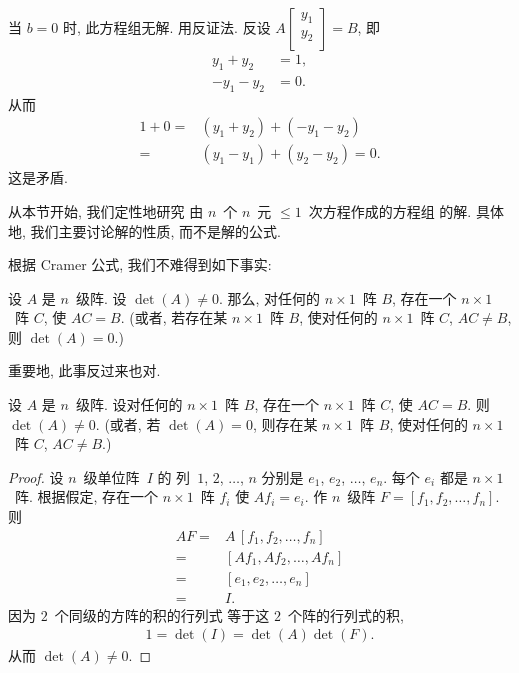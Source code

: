 \documentclass[../libro.tex]{subfiles}
\begin{document}
\begin{example}
    当 \(b = 0\) 时, 此方程组无解.
    用反证法.
    反设
    \(
        A
        \begin{bmatrix}
            y_1 \\
            y_2 \\
        \end{bmatrix}
        = B
    \),
    即
    \begin{align*}
        y_1 + y_2  & = 1, \\
        -y_1 - y_2 & = 0.
    \end{align*}
    从而
    \begin{align*}
        1 + 0
        = {} & (y_1 + y_2) + (-y_1 - y_2) \\
        = {} & (y_1 - y_1) + (y_2 - y_2) = 0.
    \end{align*}
    这是矛盾.
\end{example}

从本节开始, 我们定性地研究%
由 \(n\)~个 \(n\)~元 \({\leq} 1\)~次方程作成的方程组%
的解.
具体地, 我们主要讨论解的性质,
而不是解的公式.

根据 Cramer 公式, 我们不难得到如下事实:

\begin{theorem}
    设 \(A\) 是 \(n\)~级阵.
    设 \(\det {(A)} \neq 0\).
    那么, 对任何的 \(n \times 1\)~阵 \(B\),
    存在一个 \(n \times 1\)~阵 \(C\),
    使 \(AC = B\).
    (或者, %
    若存在某 \(n \times 1\)~阵 \(B\),
    使对任何的 \(n \times 1\)~阵 \(C\),
    \(AC \neq B\),
    则 \(\det {(A)} = 0\).) %
\end{theorem}

重要地, 此事反过来也对.

\begin{theorem}
    设 \(A\) 是 \(n\)~级阵.
    设对任何的 \(n \times 1\)~阵 \(B\),
    存在一个 \(n \times 1\)~阵 \(C\),
    使 \(AC = B\).
    则 \(\det {(A)} \neq 0\).
    (或者, %
    若 \(\det {(A)} = 0\),
    则存在某 \(n \times 1\)~阵 \(B\),
    使对任何的 \(n \times 1\)~阵 \(C\),
    \(AC \neq B\).) %
\end{theorem}

\begin{proof}
    设 \(n\)~级单位阵~\(I\) 的%
    列~\(1\), \(2\), \(\dots\), \(n\)
    分别是
    \(e_1\), \(e_2\), \(\dots\), \(e_n\).
    每个 \(e_i\) 都是 \(n \times 1\)~阵.
    根据假定, 存在一个 \(n \times 1\)~阵 \(f_i\)
    使 \(Af_i = e_i\).
    作 \(n\)~级阵
    \(F = [f_1, f_2, \dots, f_n]\).
    则
    \begin{align*}
        AF
        = {} & A\, [f_1, f_2, \dots, f_n] \\
        = {} & [Af_1, Af_2, \dots, Af_n]  \\
        = {} & [e_1, e_2, \dots, e_n]     \\
        = {} & I.
    \end{align*}
    因为 \(2\)~个同级的方阵的积的行列式%
    等于这 \(2\)~个阵的行列式的积,
    \begin{align*}
        1 = \det {(I)} = \det {(A)} \det {(F)}.
    \end{align*}
    从而 \(\det {(A)} \neq 0\).
\end{proof}
\end{document}
